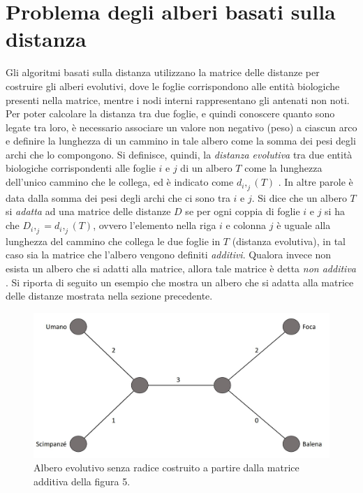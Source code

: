 \section{Problema degli alberi basati sulla distanza}
Gli algoritmi basati sulla distanza utilizzano la matrice delle distanze per costruire gli alberi evolutivi, dove le foglie corrispondono alle entità biologiche presenti nella matrice, mentre i nodi interni rappresentano gli antenati non noti. Per poter calcolare la distanza tra due foglie, e quindi conoscere quanto sono legate tra loro, è necessario associare un valore non negativo (peso) a ciascun arco e definire la lunghezza di un cammino in tale albero come la somma dei pesi degli archi che lo compongono. Si definisce, quindi, la \textit{distanza evolutiva} tra due entità biologiche corrispondenti alle foglie $i$ e $j$ di un albero $T$ come la lunghezza dell'unico cammino che le collega, ed è indicato come $d_i,_j(T)$ \cite{bioinfalganactivelearningapproachparttwo}. In altre parole è data dalla somma dei pesi degli archi che ci sono tra $i$ e $j$.
\newline
Si dice che un albero $T$ si \textit{adatta} ad una matrice delle distanze $D$ se per ogni coppia di foglie $i$ e $j$ si ha che $D_i,_j=d_i,_j(T)$, ovvero l'elemento nella riga $i$ e colonna $j$ è uguale alla lunghezza del cammino che collega le due foglie in $T$ (distanza evolutiva), in tal caso sia la matrice che l'albero vengono definiti \textit{additivi}. Qualora invece non esista un albero che si adatti alla matrice, allora tale matrice è detta \textit{non additiva} \cite{bioinfalganactivelearningapproachparttwo}.
\newline
Si riporta di seguito un esempio che mostra un albero che si adatta alla matrice delle distanze mostrata nella sezione precedente.
\begin{figure}[h!]
	\includegraphics[width=\linewidth]{unrooted_tree_created_by_figure_5.jpg}
 	\caption{Albero evolutivo senza radice costruito a partire dalla matrice additiva della figura 5.}
  	\label{fig:EvolutionaryTreeExample}
\end{figure}
